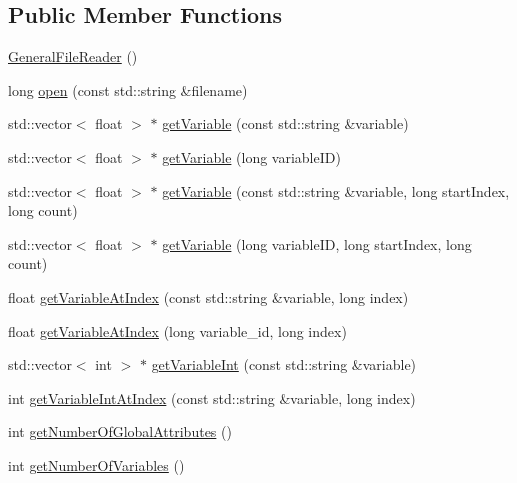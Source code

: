 \subsection*{Public Member Functions}
\begin{DoxyCompactItemize}
\item 
\hyperlink{classccmc_1_1_general_file_reader_a617946630c27444852aba7e4b63a7083}{General\-File\-Reader} ()
\item 
long \hyperlink{classccmc_1_1_general_file_reader_a4996a8e305a2e1f9f25228d127bb55bf}{open} (const std\-::string \&filename)
\item 
std\-::vector$<$ float $>$ $\ast$ \hyperlink{classccmc_1_1_general_file_reader_a15db2e13a3cc71bf0fea4ea46725c22a}{get\-Variable} (const std\-::string \&variable)
\item 
std\-::vector$<$ float $>$ $\ast$ \hyperlink{classccmc_1_1_general_file_reader_af665752bc662aa649922a4f30a402237}{get\-Variable} (long variable\-I\-D)
\item 
std\-::vector$<$ float $>$ $\ast$ \hyperlink{classccmc_1_1_general_file_reader_aeff376239d655e3783354189f4f3d66d}{get\-Variable} (const std\-::string \&variable, long start\-Index, long count)
\item 
std\-::vector$<$ float $>$ $\ast$ \hyperlink{classccmc_1_1_general_file_reader_a28a9e659f4708f24cd3208e1e5c72e7c}{get\-Variable} (long variable\-I\-D, long start\-Index, long count)
\item 
float \hyperlink{classccmc_1_1_general_file_reader_a61068a06575870558c7939f66b562848}{get\-Variable\-At\-Index} (const std\-::string \&variable, long index)
\item 
float \hyperlink{classccmc_1_1_general_file_reader_a19fa7bdf7fa3398daa7760bd045ae462}{get\-Variable\-At\-Index} (long variable\-\_\-id, long index)
\item 
std\-::vector$<$ int $>$ $\ast$ \hyperlink{classccmc_1_1_general_file_reader_a9715fb0dcb4c322dcff51749ba1dcf70}{get\-Variable\-Int} (const std\-::string \&variable)
\item 
int \hyperlink{classccmc_1_1_general_file_reader_a14473611318b2de4f43a3a5f52ad5bf1}{get\-Variable\-Int\-At\-Index} (const std\-::string \&variable, long index)
\item 
int \hyperlink{classccmc_1_1_general_file_reader_a4d5b8ad6260f905b37f802ee03779914}{get\-Number\-Of\-Global\-Attributes} ()
\item 
int \hyperlink{classccmc_1_1_general_file_reader_a7230506f5c5b62d33ef63864ef93a75c}{get\-Number\-Of\-Variables} ()

\end{DoxyCompactItemize}
